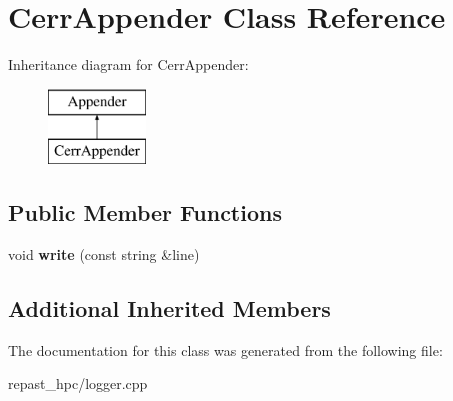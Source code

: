 \hypertarget{class_cerr_appender}{\section{Cerr\-Appender Class Reference}
\label{class_cerr_appender}
}
Inheritance diagram for Cerr\-Appender\-:\begin{figure}[H]
\begin{center}
\leavevmode
\includegraphics[height=2.000000cm]{class_cerr_appender}
\end{center}
\end{figure}
\subsection*{Public Member Functions}
\begin{DoxyCompactItemize}
\item 
\hypertarget{class_cerr_appender_a190f6e2f820f26bf51aa142eb746f041}{void {\bfseries write} (const string \&line)}\label{class_cerr_appender_a190f6e2f820f26bf51aa142eb746f041}

\end{DoxyCompactItemize}
\subsection*{Additional Inherited Members}


The documentation for this class was generated from the following file\-:\begin{DoxyCompactItemize}
\item 
repast\-\_\-hpc/logger.\-cpp\end{DoxyCompactItemize}
